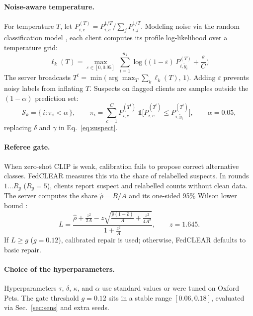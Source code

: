 \documentclass[runningheads]{llncs}
\begin{document}
\paragraph{Noise-aware temperature.}
For temperature $T$, let $P^{(T)}_{i,c} = P_{i,c}^{1/T} / \sum_{j} P_{i,j}^{1/T}$. Modeling noise via the random classification model \cite{angluin1988learning}, each client computes its profile log-likelihood over a temperature grid:
\begin{equation}
\ell_k(T) = \max_{\varepsilon \in [0, 0.95]} \;\sum_{i=1}^{n_k}
\log\Big( (1-\varepsilon)\, P^{(T)}_{i,\tilde{y}_i} + \frac{\varepsilon}{C} \Big)
\label{eq:profile}
\end{equation}
The server broadcasts $T^{t} = \min\big(\arg\max_T \sum_k \ell_k(T),\, 1\big)$. Adding $\varepsilon$ prevents noisy labels from inflating $T$. Suspects on flagged clients are samples outside the $(1-\alpha)$ prediction set:
\begin{equation}
\mathcal{S}_k = \{\, i : \pi_i < \alpha \,\}, \qquad
\pi_i = \sum_{c=1}^{C} P^{(T^t)}_{i,c}\; \mathbb{1}\big[P^{(T^t)}_{i,c} \le P^{(T^t)}_{i,\tilde{y}_i}\big],
\qquad \alpha = 0.05,
\label{eq:pvalue}
\end{equation}
replacing $\delta$ and $\gamma$ in Eq.~\eqref{eq:suspect}. 

\paragraph{Referee gate.}
When zero-shot CLIP is weak, calibration fails to propose correct alternative classes. FedCLEAR measures this via the share of relabelled suspects. In rounds $1 \dots R_g$ ($R_g=5$), clients report suspect and relabelled counts without clean data. The server computes the share $\hat{\rho} = B / A$ and its one-sided 95\% Wilson lower bound \cite{wilson1927probable}:
\begin{equation}
L = \frac{\hat{\rho} + \frac{z^2}{2A} - z\sqrt{\frac{\hat{\rho}(1-\hat{\rho})}{A} + \frac{z^2}{4A^2}}}
         {1 + \frac{z^2}{A}}, \qquad z = 1.645 .
\label{eq:gate}
\end{equation}
If $L \ge g$ ($g=0.12$), calibrated repair is used; otherwise, FedCLEAR defaults to basic repair.

\paragraph{Choice of the hyperparameters.}
Hyperparameters $\tau$, $\delta$, $\kappa$, and $\alpha$ use standard values or were tuned on Oxford Pets. The gate threshold $g=0.12$ sits in a stable range $[0.06, 0.18]$, evaluated via Sec.~\ref{sec:sens} and extra seeds.
\end{document}
